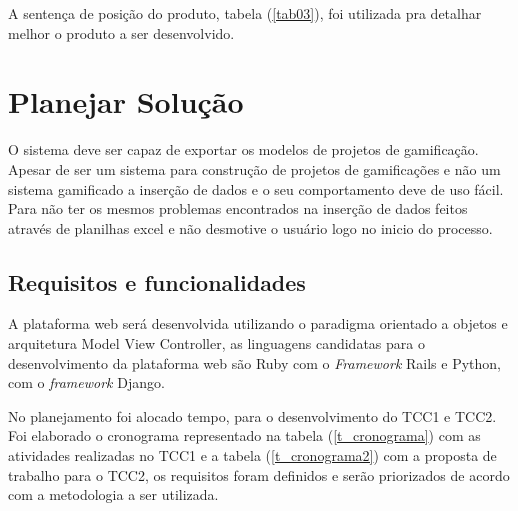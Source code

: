 A sentença de posição do produto, tabela (\ref{tab03}), foi utilizada pra detalhar melhor o produto a ser desenvolvido.

\newpage

\section {Planejar Solução}

O sistema deve ser capaz de exportar os modelos de projetos de gamificação. Apesar de ser um sistema para construção de projetos de gamificações e não um sistema gamificado a inserção de dados e o seu comportamento deve de uso fácil. Para não ter os mesmos problemas encontrados na inserção de dados feitos através de planilhas excel e não desmotive o usuário logo no inicio do processo. 


\subsection{Requisitos e funcionalidades}

A plataforma web será desenvolvida utilizando o paradigma orientado a objetos e arquitetura Model View Controller, as linguagens candidatas para o desenvolvimento da plataforma web são Ruby com o \textit{Framework} Rails e Python, com o \textit{framework} Django.

No planejamento foi alocado tempo, para o desenvolvimento do TCC1 e TCC2. Foi elaborado o cronograma representado na tabela (\ref{t_cronograma}) com as atividades realizadas no TCC1 e a tabela (\ref{t_cronograma2}) com a proposta de trabalho para o TCC2, os requisitos foram definidos e serão priorizados de acordo com a metodologia a ser utilizada.

